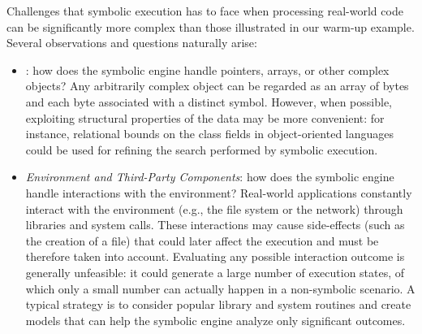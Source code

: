 Challenges that symbolic execution has to face when processing real-world code can be significantly more complex than those illustrated in our warm-up example. Several observations and questions naturally arise:

\begin{itemize}[itemsep=2mm]

\item {}: how does the symbolic engine handle pointers, arrays, or other complex objects? Any arbitrarily complex object can be regarded as an array of bytes and each byte associated with a distinct symbol. However, when possible, exploiting structural properties of the data may be more convenient: for instance, relational bounds on the class fields in object-oriented languages could be used for refining the search performed by symbolic execution.

\item {\em Environment and Third-Party Components}: how does the symbolic engine handle interactions with the environment?
  Real-world applications constantly interact with the environment (e.g., the file system or the network) through libraries and system calls. These interactions may cause side-effects
(such as the creation of a file) that could later affect the execution and must be therefore taken into account. Evaluating any possible interaction outcome is generally unfeasible: it could generate a large number of execution states, of which only a small number can actually happen in a non-symbolic scenario. A typical strategy is to consider popular library and system routines and create models that can help the symbolic engine analyze only significant outcomes.



\end{itemize}
